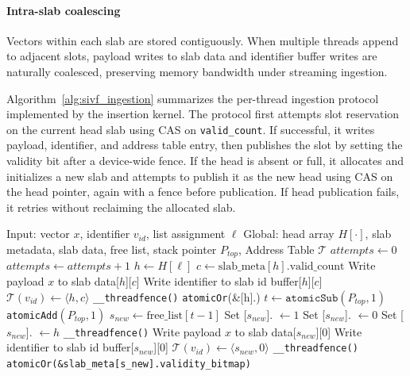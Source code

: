 \documentclass[sigconf,anonymous]{acmart}
\theoremstyle{plain}
\theoremstyle{definition}
\theoremstyle{remark}
\begin{document}
\paragraph{Intra-slab coalescing}
Vectors within each slab are stored contiguously. When multiple threads append to adjacent slots, payload writes to slab data and identifier buffer writes are naturally coalesced, preserving memory bandwidth under streaming ingestion.

Algorithm~\ref{alg:sivf_ingestion} summarizes the per-thread ingestion protocol implemented by the insertion kernel. The protocol first attempts slot reservation on the current head slab using CAS on \texttt{valid\_count}. If successful, it writes payload, identifier, and address table entry, then publishes the slot by setting the validity bit after a device-wide fence. If the head is absent or full, it allocates and initializes a new slab and attempts to publish it as the new head using CAS on the head pointer, again with a fence before publication. If head publication fails, it retries without reclaiming the allocated slab.

\begin{algorithm}[t]
\caption{Lock-free ingestion protocol in SIVF}
\label{alg:sivf_ingestion}
\begin{algorithmic}[1]
\State Input: vector $x$, identifier $v_{id}$, list assignment $\ell$
\State Global: head array $H[\cdot]$, slab metadata, slab data, free list, stack pointer $P_{top}$, Address Table $\mathcal{T}$
\State $attempts \gets 0$
    \State $attempts \gets attempts + 1$
    \State $h \gets H[\ell]$
        \State $c \gets \text{slab\_meta}[h].\text{valid\_count}$
                \State Write payload $x$ to slab data[$h$][$c$]
                \State Write identifier to slab id buffer[$h$][$c$]
                \State $\mathcal{T}(v_{id}) \gets \langle h, c \rangle$
                \State \verb|__threadfence()|
                \State \texttt{atomicOr}(\&[h].)
                \State \Return
            \EndIf
        \EndIf
    \EndIf
    \State $t \gets \texttt{atomicSub}(P_{top}, 1)$
        \State \texttt{atomicAdd}$(P_{top}, 1)$
        \State \Return
    \EndIf
    \State $s_{new} \gets \text{free\_list}[t-1]$
    \State Set [$s_{new}$]. $\gets 1$
    \State Set [$s_{new}$]. $\gets 0$
    \State Set [$s_{new}$]. $\gets h$
    \State \verb|__threadfence()|
        \State Write payload $x$ to slab data[$s_{new}$][$0$]
        \State Write identifier to slab id buffer[$s_{new}$][$0$]
        \State $\mathcal{T}(v_{id}) \gets \langle s_{new}, 0 \rangle$
        \State \verb|__threadfence()|
        \State \texttt{atomicOr(\&slab\_meta[s\_new].validity\_bitmap)}
        \State \Return
    \EndIf
\EndWhile
\end{algorithmic}
\end{algorithm}
\end{document}
